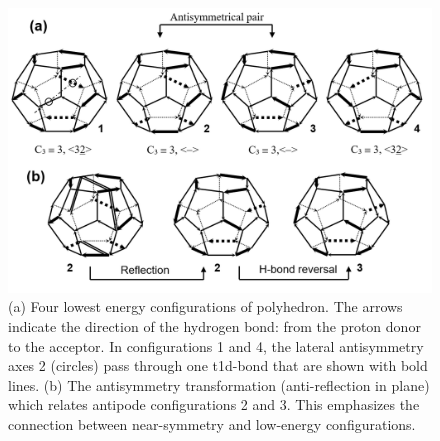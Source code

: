 \begin{figure}[t]
\uwsinglespace
\begin{center}
\includegraphics[width=.9\textwidth]{Figures/Chapter_6/symmetry_operations.png}
\end{center}
\begin{spacing}{1.0}
\caption[(a) Four lowest energy configurations of  polyhedron. The arrows indicate the direction of the hydrogen bond: from the proton donor to the acceptor. In configurations 1 and 4, the lateral antisymmetry axes 2 (circles) pass through one t1d-bond that are shown with bold lines. (b) The antisymmetry transformation (anti-reflection in plane) which relates antipode configurations 2 and 3. This emphasizes the connection between near-symmetry and low-energy configurations.]{(a) Four lowest energy configurations of  polyhedron. The arrows indicate the direction of the hydrogen bond: from the proton donor to the acceptor. In configurations 1 and 4, the lateral antisymmetry axes 2 (circles) pass through one t1d-bond that are shown with bold lines. (b) The antisymmetry transformation (anti-reflection in plane) which relates antipode configurations 2 and 3. This emphasizes the connection between near-symmetry and low-energy configurations.}\label{fig:MBE_III_F7}
\end{spacing}
\end{figure}